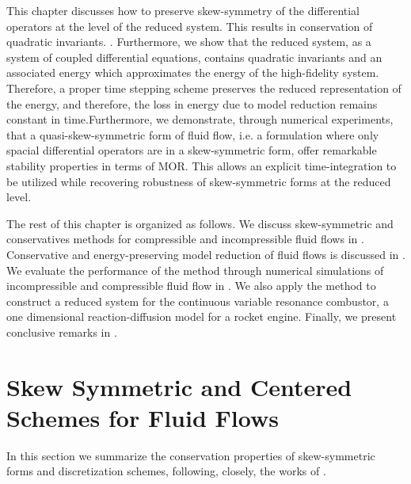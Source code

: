 This chapter discusses how to preserve skew-symmetry of the differential operators at the level of the reduced system. This results in conservation of quadratic invariants. . Furthermore, we show that the reduced system, as a system of coupled differential equations, contains quadratic invariants and an associated energy which approximates the energy of the high-fidelity system. Therefore, a proper time stepping scheme preserves the reduced representation of the energy, and therefore, the loss in energy due to model reduction remains constant in time.Furthermore, we demonstrate, through numerical experiments, that a quasi-skew-symmetric form of fluid flow, i.e. a formulation where only spacial differential operators are in a skew-symmetric form, offer remarkable stability properties in terms of MOR. This allows an explicit time-integration to be utilized while recovering robustness of skew-symmetric forms at the reduced level.

The rest of this chapter is organized as follows. We discuss skew-symmetric and conservatives methods for compressible and incompressible fluid flows in . Conservative and energy-preserving model reduction of fluid flows is discussed in . We evaluate the performance of the method through numerical simulations of incompressible and compressible fluid flow in . We also apply the method to construct a reduced system for the continuous variable resonance combustor, a one dimensional reaction-diffusion model for a rocket engine. Finally, we present conclusive remarks in .

\section{Skew Symmetric and Centered Schemes for Fluid Flows} \label{p4.sec:skew}

In this section we summarize the conservation properties of skew-symmetric forms and discretization schemes, following, closely, the works of \cite{morinishi2010skew,morinishi1998fully,tadmor1984skew,reiss2014conservative}.

